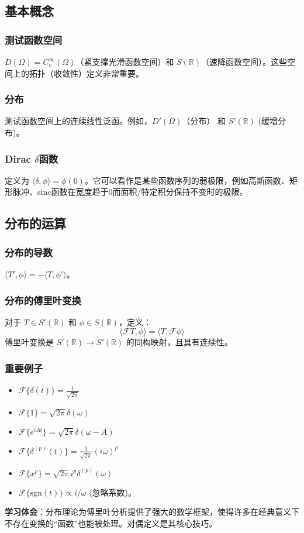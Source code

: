 \documentclass[UTF8]{ctexart}
\begin{document}
	\subsection{基本概念}
	\subsubsection{测试函数空间}
	$D(\Omega) = C_c^\infty(\Omega)$（紧支撑光滑函数空间）和 $S(\mathbb{R})$（速降函数空间）。这些空间上的拓扑（收敛性）定义非常重要。
	\subsubsection{分布}
	测试函数空间上的连续线性泛函。例如，$D'(\Omega)$（分布） 和 $S'(\mathbb{R})$ (缓增分布)。
	\subsubsection{Dirac $\delta$函数}
	定义为 $\langle \delta, \phi \rangle = \phi(0)$。它可以看作是某些函数序列的弱极限，例如高斯函数、矩形脉冲、sinc函数在宽度趋于0而面积/特定积分保持不变时的极限。
	
	\subsection{分布的运算}
	\subsubsection{分布的导数}
	$\langle T', \phi \rangle = -\langle T, \phi' \rangle$。
	\subsubsection{分布的傅里叶变换}
	对于 $T \in S'(\mathbb{R})$ 和 $\phi \in S(\mathbb{R})$，定义：
	\[ \langle \mathcal{F}T, \phi \rangle = \langle T, \mathcal{F}\phi \rangle \]
	傅里叶变换是 $S'(\mathbb{R}) \to S'(\mathbb{R})$ 的同构映射，且具有连续性。
	
	\subsubsection{重要例子}
	\begin{itemize}
		\item $\mathcal{F}\{\delta(t)\} = \frac{1}{\sqrt{2\pi}}$
		\item $\mathcal{F}\{1\} = \sqrt{2\pi}\delta(\omega)$
		\item $\mathcal{F}\{e^{iAt}\} = \sqrt{2\pi}\delta(\omega-A)$
		\item $\mathcal{F}\{\delta^{(p)}(t)\} = \frac{1}{\sqrt{2\pi}}(i\omega)^p$
		\item $\mathcal{F}\{x^p\} = \sqrt{2\pi}i^p \delta^{(p)}(\omega)$
		\item $\mathcal{F}\{\text{sgn}(t)\} \propto i/\omega$ (忽略系数)。
	\end{itemize}
	\textbf{学习体会}：分布理论为傅里叶分析提供了强大的数学框架，使得许多在经典意义下不存在变换的“函数”也能被处理。对偶定义是其核心技巧。
	
\end{document}
